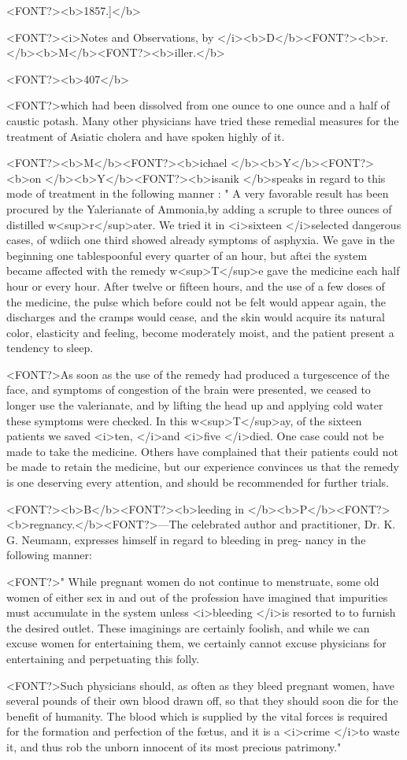 <FONT?><b>1857.]</b>

<FONT?><i>Notes and Observations, by </i><b>D</b><FONT?><b>r. </b><b>M</b><FONT?><b>iller.</b>

<FONT?><b>407</b>

<FONT?>which had been dissolved from one ounce to one ounce and a half of
caustic potash. Many other physicians have tried these remedial
measures for the treatment of Asiatic cholera and have spoken highly
of it.

<FONT?><b>M</b><FONT?><b>ichael </b><b>Y</b><FONT?><b>on </b><b>Y</b><FONT?><b>isanik </b>speaks in regard to this mode of treatment
in the following manner : " A very favorable result has been procured
by the Yalerianate of Ammonia,by adding a scruple to three ounces of
distilled w<sup>r</sup>ater. We tried it in <i>sixteen </i>selected dangerous cases, of
wdiich one third showed already symptoms of asphyxia. We gave in
the beginning one tablespoonful every quarter of an hour, but aftei
the system became affected with the remedy w<sup>T</sup>e gave the medicine
each half hour or every hour. After twelve or fifteen hours, and the
use of a few doses of the medicine, the pulse which before could not
be felt would appear again, the discharges and the cramps would cease,
and the skin would acquire its natural color, elasticity and feeling,
become moderately moist, and the patient present a tendency to sleep.

<FONT?>As soon as the use of the remedy had produced a turgescence of the
face, and symptoms of congestion of the brain were presented, we
ceased to longer use the valerianate, and by lifting the head up and
applying cold water these symptoms were checked. In this w<sup>T</sup>ay, of
the sixteen patients we saved <i>ten, </i>and <i>five </i>died. One case could not
be made to take the medicine. Others have complained that their
patients could not be made to retain the medicine, but our experience
convinces us that the remedy is one deserving every attention, and
should be recommended for further trials.

<FONT?><b>B</b><FONT?><b>leeding in </b><b>P</b><FONT?><b>regnancy.</b><FONT?>---The celebrated author and practitioner,
Dr. K. G. Neumann, expresses himself in regard to bleeding in preg-
nancy in the following manner:

<FONT?>" While pregnant women do not continue to menstruate, some old
women of either sex in and out of the profession have imagined that
impurities must accumulate in the system unless <i>bleeding </i>is resorted to
to furnish the desired outlet. These imaginings are certainly foolish,
and while we can excuse women for entertaining them, we certainly
cannot excuse physicians for entertaining and perpetuating this folly.

<FONT?>Such physicians should, as often as they bleed pregnant women,
have several pounds of their own blood drawn off, so that they should
soon die for the benefit of humanity. The blood which is supplied by
the vital forces is required for the formation and perfection of the fœtus,
and it is a <i>crime </i>to waste it, and thus rob the unborn innocent of its
most precious patrimony."\endinput
